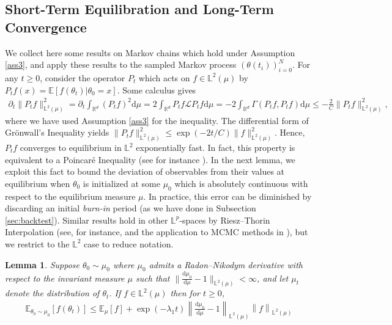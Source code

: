 \documentclass[11pt]{article}
\theoremstyle{plain}
\newtheorem{lemma}[theorem]{Lemma}
\theoremstyle{definition}
\theoremstyle{remark}
\numberwithin{equation}{section}
\newcommand{\R}{\mathbb{R}}
\renewcommand{\L}{\mathscr{L}}
\renewcommand{\d}{\mathrm{d}}
\newcommand{\lb}{\left}
\newcommand{\rb}{\right}
\newcommand{\pp}{\partial}
\newcommand{\bL}{\mathbb{L}}
\newcommand{\E}{\mathbb{E}}
\begin{document}
\subsection{Short-Term Equilibration and Long-Term Convergence}\label{sec:lifts}

We collect here some results on Markov chains which hold under Assumption \ref{ass3}, and apply these results to the sampled Markov process $(\theta(t_i))_{i=0}^N$. For any $t\ge0$, consider the operator $P_t$ which acts on $f\in\bL^2(\mu)$ by $P_tf(x)=\E[f(\theta_t)|\theta_0=x]$. Some calculus gives
\begin{align*}
\pp_t \|P_tf\|_{\bL^2(\mu)}^2=\pp_t \int_{\R^d} (P_tf)^2\d \mu=2\int_{\R^d} P_tf \L P_tf \d \mu =-2\int_{\R^d} \Gamma(P_tf,P_tf)\d \mu\le -\frac{2}{C} \|P_tf\|_{\bL^2(\mu)}^2,
\end{align*}
where we have used Assumption \ref{ass3} for the inequality. The differential form of Gr\"{o}nwall's Inequality yields $\|P_tf\|_{\bL^2(\mu)}^2\le \exp(-2t/C)\|f\|_{\bL^2(\mu)}^2$. Hence, $P_tf$ converges to equilibrium in $\bL^2$ exponentially fast. In fact, this property is equivalent to a Poincar\'{e} Inequality (see for instance \citet[Theorem 4.2.5]{bakry_analysis_2014}). In the next lemma, we exploit this fact to bound the deviation of observables from their values at equilibrium when $\theta_0$ is initialized at some $\mu_0$ which is absolutely continuous with respect to the equilibrium measure $\mu$. In practice, this error can be diminished by discarding an initial \emph{burn-in} period (as we have done in Subsection \ref{sec:backtest}). Similar results hold in other $\bL^p$-spaces by Riesz--Thorin Interpolation (see, for instance, \citet[Proposition 3.17]{rudolf_explicit_2012} and the application to MCMC methods in \citet[Theorem 12]{fan_hoeffdings_2021}), but we restrict to the $\bL^2$ case to reduce notation.

\begin{lemma}\label{lem:burnin}
Suppose $\theta_0\sim \mu_0$ where $\mu_0$ admits a Radon--Nikodym derivative with respect to the invariant measure $\mu$ such that $\|\frac{\d\mu_0}{\d\mu}-1\|_{\bL^2(\mu)}<\infty$, and let $\mu_t$ denote the distribution of $\theta_t$. If $f\in \bL^2(\mu)$ then for $t\ge0$,
\begin{align*}
\E_{\theta_0\sim\mu_0}\lb[f(\theta_t) \rb]\le \E_\mu[f]+
\exp\lb(-\lambda_1 t\rb)\lb\|\frac{\d\mu_0}{\d\mu}-1\rb\|_{\bL^2(\mu)}\lb\|f\rb\|_{\bL^2(\mu)}
\end{align*}
\end{lemma}
\end{document}
